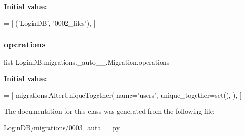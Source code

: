 {\bfseries Initial value\+:}
\begin{DoxyCode}
=  [
        (\textcolor{stringliteral}{'LoginDB'}, \textcolor{stringliteral}{'0002\_files'}),
    ]
\end{DoxyCode}
\mbox{\label{class_login_d_b_1_1migrations_1_10003__auto__20201206__1720_1_1_migration_ae20b162455f88dd14980f2e20090db64}} 
\subsubsection{\texorpdfstring{operations}{operations}}
{\footnotesize\ttfamily list Login\+D\+B.\+migrations.\+\_\+auto\+\_\+\_.\+Migration.\+operations\hspace{0.3cm}{\ttfamily [static]}}

{\bfseries Initial value\+:}
\begin{DoxyCode}
=  [
        migrations.AlterUniqueTogether(
            name=\textcolor{stringliteral}{'users'},
            unique\_together=set(),
        ),
    ]
\end{DoxyCode}


The documentation for this class was generated from the following file\+:\begin{DoxyCompactItemize}
\item 
Login\+D\+B/migrations/\hyperlink{0003__auto__20201206__1720_8py}{0003\+\_\+auto\+\_\+\_.\+py}\end{DoxyCompactItemize}

